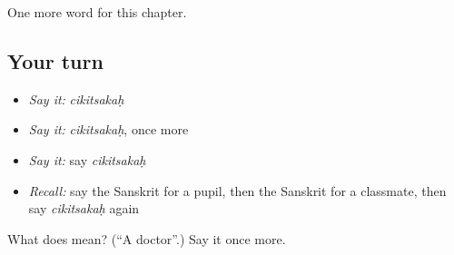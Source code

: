 \begin{grammarlens}[title={What you've built}]
One more word for this chapter.
\end{grammarlens}

\subsection*{Your turn}
\begin{itemize}
\raggedright
  \item \emph{Say it:} \emph{cikitsakaḥ}
  \item \emph{Say it:} \emph{cikitsakaḥ}, once more
  \item \emph{Say it:} say \emph{cikitsakaḥ}
  \item \emph{Recall:} say the Sanskrit for a pupil, then the Sanskrit for a classmate, then say \emph{cikitsakaḥ} again
\end{itemize}

\begin{tcolorbox}[breakable,colback=teal!4,colframe=teal!35!black,title={Before you move on}]
What does  mean? (\textquotedblleft{}A doctor\textquotedblright{}.) Say it once more.
\end{tcolorbox}

